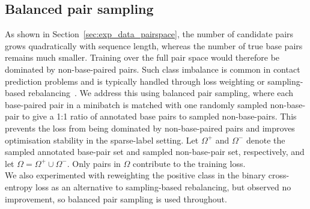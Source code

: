 \documentclass[logo,bsc,singlespacing,parskip]{infthesis}
\begin{document}
\subsection{Balanced pair sampling}
\label{sec:methods_training_sampling}
As shown in Section~\ref{sec:exp_data_pairspace}, the number of candidate pairs grows quadratically with sequence length, whereas the number of true base pairs remains much smaller. Training over the full pair space would therefore be dominated by non-base-paired pairs. Such class imbalance is common in contact prediction problems and is typically handled through loss weighting or sampling-based rebalancing~\citep{rao2021unsupervised,fu2022ufold}. We address this using balanced pair sampling, where each base-paired pair in a minibatch is matched with one randomly sampled non-base-pair to give a 1:1 ratio of annotated base pairs to sampled non-base-pairs. This prevents the loss from being dominated by non-base-paired pairs and improves optimisation stability in the sparse-label setting. Let $\Omega^+$ and $\Omega^-$ denote the sampled annotated base-pair set and sampled non-base-pair set, respectively, and let $\Omega=\Omega^+\cup\Omega^-$.
Only pairs in $\Omega$ contribute to the training loss. \\

We also experimented with reweighting the positive class in the binary cross-entropy loss as an alternative to sampling-based rebalancing, but observed no improvement, so balanced pair sampling is used throughout.
\end{document}
